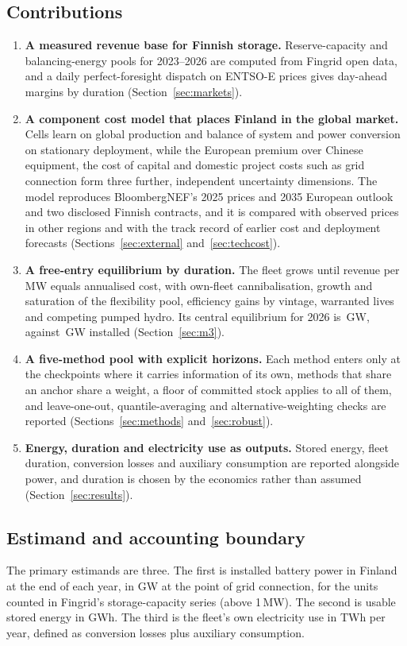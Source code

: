 \documentclass[11pt]{article}
\begin{document}
\subsection{Contributions}
\begin{enumerate}[leftmargin=*]
\item \textbf{A measured revenue base for Finnish storage.} Reserve-capacity and balancing-energy pools for 2023--2026 are computed from Fingrid open data, and a daily perfect-foresight dispatch on ENTSO-E prices gives day-ahead margins by duration (Section~\ref{sec:markets}).
\item \textbf{A component cost model that places Finland in the global market.} Cells learn on global production and balance of system and power conversion on stationary deployment, while the European premium over Chinese equipment, the cost of capital and domestic project costs such as grid connection form three further, independent uncertainty dimensions. The model reproduces BloombergNEF's 2025 prices and 2035 European outlook and two disclosed Finnish contracts, and it is compared with observed prices in other regions and with the track record of earlier cost and deployment forecasts (Sections~\ref{sec:external} and~\ref{sec:techcost}).
\item \textbf{A free-entry equilibrium by duration.} The fleet grows until revenue per MW equals annualised cost, with own-fleet cannibalisation, growth and saturation of the flexibility pool, efficiency gains by vintage, warranted lives and competing pumped hydro. Its central equilibrium for 2026 is \,GW, against \,GW installed (Section~\ref{sec:m3}).
\item \textbf{A five-method pool with explicit horizons.} Each method enters only at the checkpoints where it carries information of its own, methods that share an anchor share a weight, a floor of committed stock applies to all of them, and leave-one-out, quantile-averaging and alternative-weighting checks are reported (Sections~\ref{sec:methods} and~\ref{sec:robust}).
\item \textbf{Energy, duration and electricity use as outputs.} Stored energy, fleet duration, conversion losses and auxiliary consumption are reported alongside power, and duration is chosen by the economics rather than assumed (Section~\ref{sec:results}).
\end{enumerate}

\subsection{Estimand and accounting boundary}\label{sec:boundary}
The primary estimands are three.
The first is installed battery power in Finland at the end of each year, in GW at the point of grid connection, for the units counted in Fingrid's storage-capacity series (above 1\,MW).
The second is usable stored energy in GWh.
The third is the fleet's own electricity use in TWh per year, defined as conversion losses plus auxiliary consumption.
\end{document}
